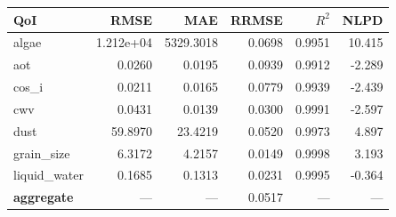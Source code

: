 \begin{tabular}{lrrrrr}
\toprule
QoI & RMSE & MAE & RRMSE & $R^2$ & NLPD \\
\midrule
algae & 1.212e+04 & 5329.3018 & 0.0698 & 0.9951 & 10.415 \\
aot & 0.0260 & 0.0195 & 0.0939 & 0.9912 & -2.289 \\
cos\_i & 0.0211 & 0.0165 & 0.0779 & 0.9939 & -2.439 \\
cwv & 0.0431 & 0.0139 & 0.0300 & 0.9991 & -2.597 \\
dust & 59.8970 & 23.4219 & 0.0520 & 0.9973 & 4.897 \\
grain\_size & 6.3172 & 4.2157 & 0.0149 & 0.9998 & 3.193 \\
liquid\_water & 0.1685 & 0.1313 & 0.0231 & 0.9995 & -0.364 \\
\midrule
\textbf{aggregate} & --- & --- & 0.0517 & --- & --- \\
\bottomrule
\end{tabular}

